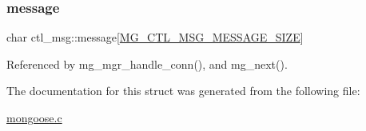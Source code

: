 \subsubsection{\texorpdfstring{message}{message}}
{\footnotesize\ttfamily char ctl\+\_\+msg\+::message\mbox{[}\hyperlink{mongoose_8c_a50aa6b3695b446ad4b8c77bbd0115c94_a50aa6b3695b446ad4b8c77bbd0115c94}{M\+G\+\_\+\+C\+T\+L\+\_\+\+M\+S\+G\+\_\+\+M\+E\+S\+S\+A\+G\+E\+\_\+\+S\+I\+ZE}\mbox{]}}



Referenced by mg\+\_\+mgr\+\_\+handle\+\_\+conn(), and mg\+\_\+next().



The documentation for this struct was generated from the following file\+:\begin{DoxyCompactItemize}
\item 
\hyperlink{mongoose_8c}{mongoose.\+c}\end{DoxyCompactItemize}
